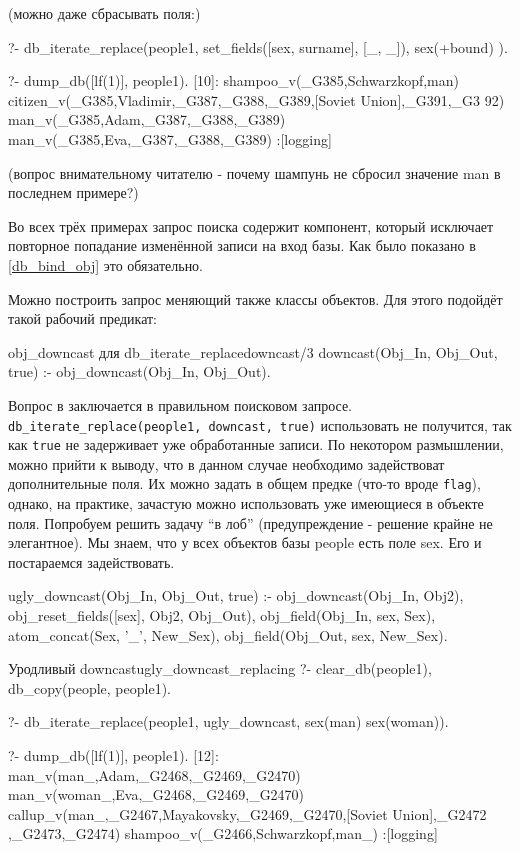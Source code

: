 \documentclass[a4paper]{book}
\begin{document}
(можно даже сбрасывать поля:)

\begin{example}{}{}
?- db_iterate_replace(people1, 
      set_fields([sex, surname], [_, _]), 
      sex(+bound)
   ).                                                     

?- dump_db([lf(1)], people1).
[10]: shampoo_v(_G385,Schwarzkopf,man) 
citizen_v(_G385,Vladimir,_G387,_G388,_G389,[Soviet Union],_G391,_G3
92)                                                               
man_v(_G385,Adam,_G387,_G388,_G389) 
man_v(_G385,Eva,_G387,_G388,_G389) 
 :[logging]
\end{example}

(вопрос внимательному читателю - почему шампунь не сбросил
значение man в последнем примере?)

Во всех трёх примерах запрос поиска содержит компонент, который
исключает повторное попадание изменённой записи на вход базы. Как
было показано в \ref{db_bind_obj} это обязательно.

Можно построить запрос меняющий также классы объектов. Для этого
подойдёт такой рабочий предикат:

\begin{example}{obj_downcast для db_iterate_replace}{downcast/3}
downcast(Obj_In, Obj_Out, true) :- obj_downcast(Obj_In, Obj_Out).
\end{example}

Вопрос в заключается в правильном поисковом
запросе. \verb|db_iterate_replace(people1, downcast, true)|
использовать не получится, так как \verb|true| не задерживает уже
обработанные записи. По некотором размышлении, можно прийти к
выводу, что в данном случае необходимо задействоват
дополнительные поля. Их можно задать в общем предке (что-то вроде
\verb|flag|), однако, на практике, зачастую можно использовать
уже имеющиеся в объекте поля. Попробуем решить задачу ``в лоб''
(предупреждение - решение крайне не элегантное). Мы знаем, что у
всех объектов базы people есть поле sex. Его и постараемся
задействовать.

\begin{example}{}{}
ugly_downcast(Obj_In, Obj_Out, true) :- 
   obj_downcast(Obj_In, Obj2),
   obj_reset_fields([sex], Obj2, Obj_Out),
   obj_field(Obj_In, sex, Sex),
   atom_concat(Sex, '_', New_Sex),
   obj_field(Obj_Out, sex, New_Sex).
\end{example}

\begin{example}{Уродливый downcast}{ugly_downcast_replacing}
?- clear_db(people1), db_copy(people, people1).

?- db_iterate_replace(people1, 
      ugly_downcast, sex(man) \/ sex(woman)).

?- dump_db([lf(1)], people1).
[12]: man_v(man_,Adam,_G2468,_G2469,_G2470) 
man_v(woman_,Eva,_G2468,_G2469,_G2470) 
callup_v(man_,_G2467,Mayakovsky,_G2469,_G2470,[Soviet Union],_G2472
,_G2473,_G2474)                                                   
shampoo_v(_G2466,Schwarzkopf,man_) 
 :[logging]
\end{example}
\end{document}
